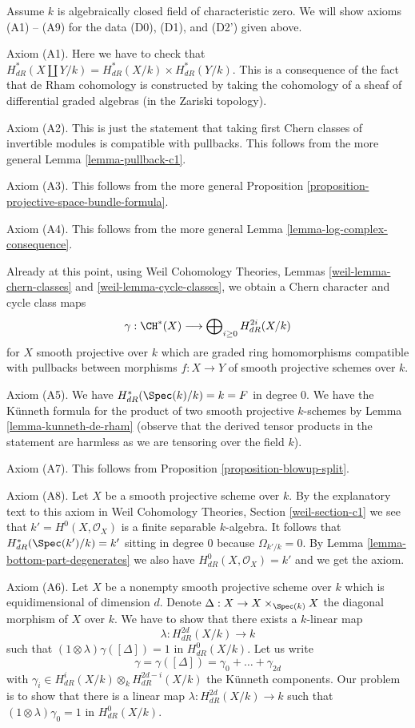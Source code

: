 \medskip\noindent
Assume $k$ is algebraically closed field of characteristic zero.
We will show axioms (A1) -- (A9) for the data (D0), (D1), and (D2')
given above.

\medskip\noindent
Axiom (A1). Here we have to check that
$H^*_{dR}(X \coprod Y/k) =  H^*_{dR}(X/k) \times H^*_{dR}(Y/k)$.
This is a consequence of the fact that de Rham cohomology
is constructed by taking the cohomology of a sheaf of differential
graded algebras (in the Zariski topology).

\medskip\noindent
Axiom (A2). This is just the statement that taking first Chern
classes of invertible modules is compatible with pullbacks.
This follows from the more general Lemma \ref{lemma-pullback-c1}.

\medskip\noindent
Axiom (A3). This follows from the more general
Proposition \ref{proposition-projective-space-bundle-formula}.

\medskip\noindent
Axiom (A4). This follows from the more general
Lemma \ref{lemma-log-complex-consequence}.

\medskip\noindent
Already at this point, using
Weil Cohomology Theories, Lemmas \ref{weil-lemma-chern-classes} and
\ref{weil-lemma-cycle-classes}, we obtain a Chern character and
cycle class maps
$$
\gamma :
\CH^*(X)
\longrightarrow
\bigoplus\nolimits_{i \geq 0} H^{2i}_{dR}(X/k)
$$
for $X$ smooth projective over $k$ which are graded ring homomorphisms
compatible with pullbacks between morphisms $f : X \to Y$
of smooth projective schemes over $k$.

\medskip\noindent
Axiom (A5). We have $H_{dR}^*(\Spec(k)/k) = k = F$ in degree $0$.
We have the K\"unneth formula for the product of two smooth projective
$k$-schemes by Lemma \ref{lemma-kunneth-de-rham} (observe that the
derived tensor products in the statement are harmless as we are
tensoring over the field $k$).

\medskip\noindent
Axiom (A7). This follows from Proposition \ref{proposition-blowup-split}.

\medskip\noindent
Axiom (A8). Let $X$ be a smooth projective scheme over $k$.
By the explanatory text to this axiom in
Weil Cohomology Theories, Section \ref{weil-section-c1}
we see that $k' = H^0(X, \mathcal{O}_X)$ is a finite
separable $k$-algebra. It follows that $H_{dR}^*(\Spec(k')/k) = k'$
sitting in degree $0$ because $\Omega_{k'/k} = 0$. By
Lemma \ref{lemma-bottom-part-degenerates}
we also have $H_{dR}^0(X, \mathcal{O}_X) = k'$ and we get
the axiom.

\medskip\noindent
Axiom (A6). Let $X$ be a nonempty smooth projective scheme over $k$
which is equidimensional of dimension $d$. Denote
$\Delta : X \to X \times_{\Spec(k)} X$
the diagonal morphism of $X$ over $k$. We have to show that there
exists a $k$-linear map
$$
\lambda : H_{dR}^{2d}(X/k) \longrightarrow k
$$
such that $(1 \otimes \lambda)\gamma([\Delta]) = 1$ in $H^0_{dR}(X/k)$.
Let us write
$$
\gamma = \gamma([\Delta]) = \gamma_0 + \ldots + \gamma_{2d}
$$
with $\gamma_i \in H_{dR}^i(X/k) \otimes_k H_{dR}^{2d - i}(X/k)$
the K\"unneth components. Our problem is to show that there is a
linear map $\lambda : H_{dR}^{2d}(X/k) \to k$ such that
$(1 \otimes \lambda)\gamma_0 = 1$ in $H^0_{dR}(X/k)$.


